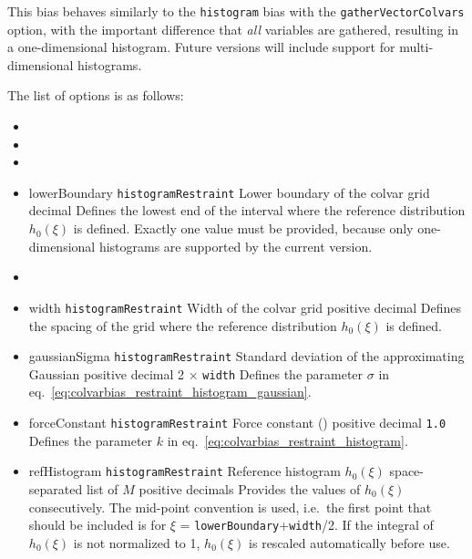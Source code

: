 This bias behaves similarly to the \texttt{histogram} bias with the \texttt{gatherVectorColvars} option, with the important difference that \emph{all} variables are gathered, resulting in a one-dimensional histogram.
Future versions will include support for multi-dimensional histograms.

The list of options is as follows:
\begin{itemize}

\item {}
\item {}
\item {}

\item %
  \key
    {lowerBoundary}{%
    \texttt{histogramRestraint}}{%
    Lower boundary of the colvar grid}{%
    decimal}{%
    Defines the lowest end of the interval where the reference distribution $h_{0}(\xi)$ is defined.
    Exactly one value must be provided, because only one-dimensional histograms are supported by the current version.
  }

\item %

\item %
  \key
  {width}{%
    \texttt{histogramRestraint}}{%
    Width of the colvar grid}{%
    positive decimal}{%
    Defines the spacing of the grid where the reference distribution $h_{0}(\xi)$ is defined.
  }

\item %
  \keydef
  {gaussianSigma}{%
    \texttt{histogramRestraint}}{%
    Standard deviation of the approximating Gaussian}{%
    positive decimal}{%
    2 $\times$ \texttt{width}}{%
    Defines the parameter $\sigma$ in eq.~\ref{eq:colvarbias_restraint_histogram_gaussian}.
  }

\item %
  \keydef
    {forceConstant}{%
    \texttt{histogramRestraint}}{%
    Force constant ()}{%
    positive decimal}{%
    \texttt{1.0}}{%
    Defines the parameter $k$ in eq.~\ref{eq:colvarbias_restraint_histogram}.
  }

\item %
  \key
  {refHistogram}{%
    \texttt{histogramRestraint}}{%
    Reference histogram $h_{0}(\xi)$}{%
    space-separated list of $M$ positive decimals}{%
    Provides the values of $h_{0}(\xi)$ consecutively.
    The mid-point convention is used, i.e.~the first point that should be included is for $\xi$ = \texttt{lowerBoundary}+\texttt{width}/2.
    If the integral of $h_{0}(\xi)$ is not normalized to 1, $h_{0}(\xi)$ is rescaled automatically before use.
  }


\end{itemize}
